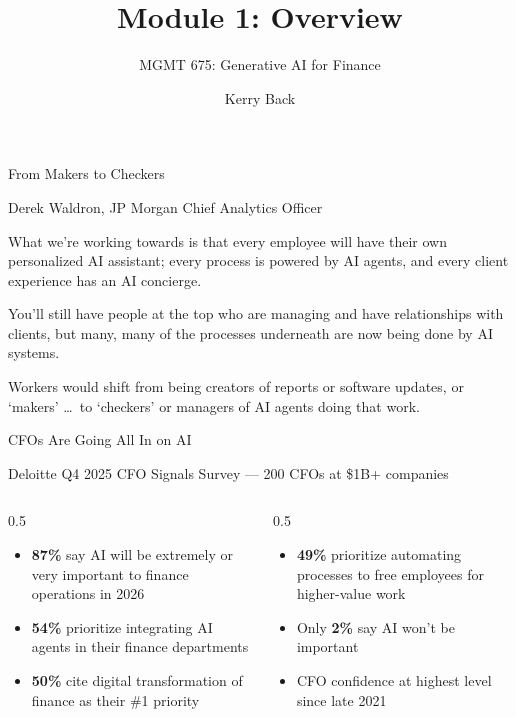 \documentclass[aspectratio=169]{beamer}
\subtitle{MGMT 675: Generative AI for Finance}
\title{Module 1: Overview}
\author{Kerry Back}
\date{}
\begin{document}
\maketitle

\begin{frame}{From Makers to Checkers}
\centerline{Derek Waldron, JP Morgan Chief Analytics Officer}

What we're working towards is that every employee will have their own personalized AI assistant; every process is powered by AI agents, and every client experience has an AI concierge.

You'll still have people at the top who are managing and have relationships with clients, but many, many of the processes underneath are now being done by AI systems.

Workers would shift from being creators of reports or software updates, or `makers' \ldots\ to `checkers' or managers of AI agents doing that work.
\end{frame}

\begin{frame}{CFOs Are Going All In on AI}
\centerline{Deloitte Q4 2025 CFO Signals Survey --- 200 CFOs at \$1B+ companies}
\vspace{0.3cm}
\begin{columns}[T]
\begin{column}{0.5\textwidth}
\begin{itemize}
  \item \textbf{87\%} say AI will be extremely or very important to finance operations in 2026
  \item \textbf{54\%} prioritize integrating AI agents in their finance departments
  \item \textbf{50\%} cite digital transformation of finance as their \#1 priority
\end{itemize}
\end{column}
\begin{column}{0.5\textwidth}
\begin{itemize}
  \item \textbf{49\%} prioritize automating processes to free employees for higher-value work
  \item Only \textbf{2\%} say AI won't be important
  \item CFO confidence at highest level since late 2021
\end{itemize}
\end{column}
\end{columns}
\end{frame}
\end{document}
